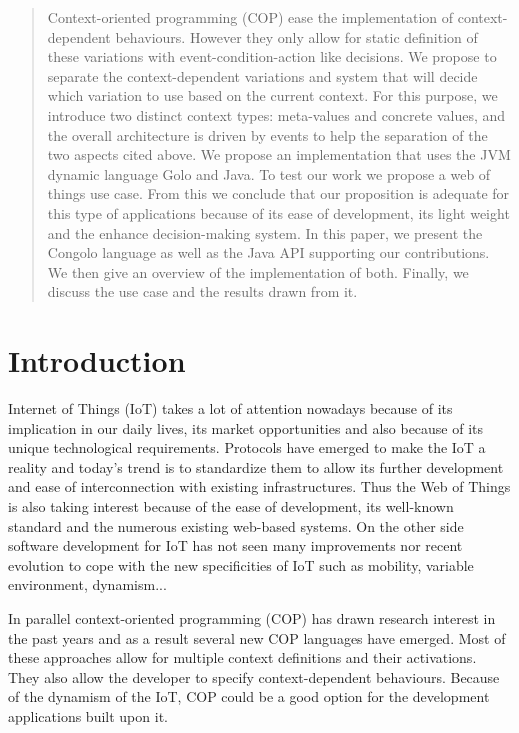 \documentclass[a4paper]{article}
\begin{document}
\begin{abstract} 
Context-oriented programming (COP) ease the implementation of context-dependent behaviours. However they only allow for static definition of these variations with event-condition-action like decisions. We propose to separate the context-dependent variations and system that will decide which variation to use based on the current context. For this purpose, we introduce two distinct context types: meta-values and concrete values, and the overall architecture is driven by events to help the separation of the two aspects cited above. We propose an implementation that uses the JVM dynamic language Golo and Java. To test our work we propose a web of things use case. From this we conclude that our proposition is adequate for this type of applications because of its ease of development, its light weight and the enhance decision-making system. In this paper, we present the Congolo language as well as the Java API supporting our contributions. We then give an overview of the implementation of both. Finally, we discuss the use case and the results drawn from it.
\end{abstract}

\newpage

%
%

\section{Introduction}

Internet of Things (IoT) takes a lot of attention nowadays because of its implication in our daily lives, its market opportunities and also because of its unique technological requirements. Protocols have emerged to make the IoT a reality and today's trend is to standardize them to allow its further development and ease of interconnection with existing infrastructures. Thus the Web of Things is also taking interest because of the ease of development, its well-known standard and the numerous existing web-based systems. On the other side software development for IoT has not seen many improvements nor recent evolution to cope with the new specificities of IoT such as mobility, variable environment, dynamism...

In parallel context-oriented programming (COP) has drawn research interest in the past years and as a result several new COP languages have emerged. Most of these approaches allow for multiple context definitions and their activations. They also allow the developer to specify context-dependent behaviours. Because of the dynamism of the IoT, COP could be a good option for the development applications built upon it.
\end{document}
